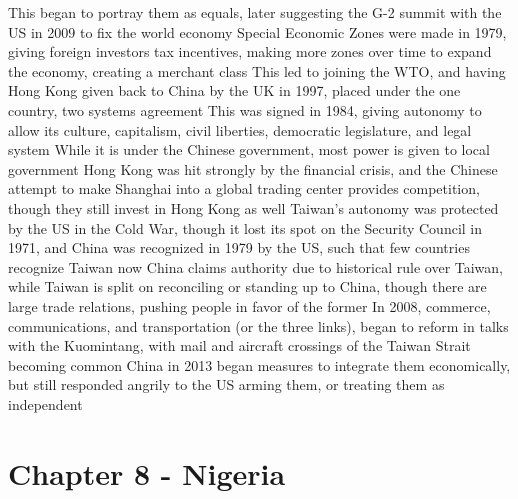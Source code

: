 \documentclass[11 pt, twoside]{article}
\newenvironment{outline*}
{
	\begin{outline}[enumerate]
	}
	{\end{outline}
}
\begin{document}
\begin{outline*}
\3 This began to portray them as equals, later suggesting the G-2 summit with the US in 2009 to fix the world economy
\2 Special Economic Zones were made in 1979, giving foreign investors tax incentives, making more zones over time to expand the economy, creating a merchant class
\3 This led to joining the WTO, and having Hong Kong given back to China by the UK in 1997, placed under the one country, two systems agreement
\4 This was signed in 1984, giving autonomy to allow its culture, capitalism, civil liberties, democratic legislature, and legal system
\4 While it is under the Chinese government, most power is given to local government
\4 Hong Kong was hit strongly by the financial crisis, and the Chinese attempt to make Shanghai into a global trading center provides competition, though they still invest in Hong Kong as well
\2 Taiwan's autonomy was protected by the US in the Cold War, though it lost its spot on the Security Council in 1971, and China was recognized in 1979 by the US, such that few countries recognize Taiwan now
\3 China claims authority due to historical rule over Taiwan, while Taiwan is split on reconciling or standing up to China, though there are large trade relations, pushing people in favor of the former
\3 In 2008, commerce, communications, and transportation (or the three links), began to reform in talks with the Kuomintang, with mail and aircraft crossings of the Taiwan Strait becoming common
\3 China in 2013 began measures to integrate them economically, but still responded angrily to the US arming them, or treating them as independent
\end{outline*}
\section{Chapter 8 - Nigeria}
\end{document}
